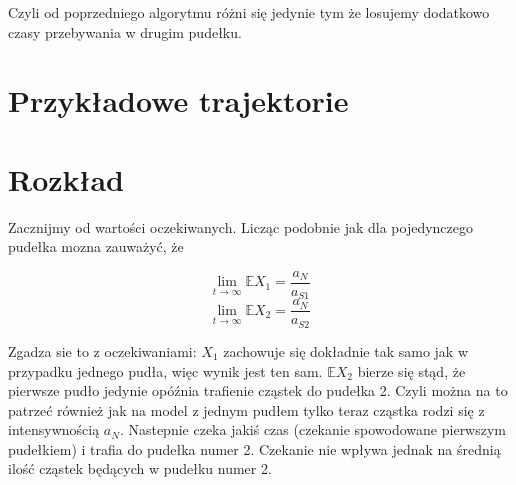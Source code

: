 \documentclass{article}
\begin{document}
Czyli od poprzedniego algorytmu różni się jedynie tym że losujemy dodatkowo czasy przebywania w drugim pudełku.

\section{Przykładowe trajektorie}

\section{Rozkład}

Zacznijmy od wartości oczekiwanych. Licząc podobnie jak dla pojedynczego pudełka mozna zauważyć, że 

\[\lim_{t\rightarrow \infty}\mathbb{E}X_1 = \frac{a_N}{a_{S1}} \]
\[\lim_{t\rightarrow \infty}\mathbb{E}X_2 = \frac{a_N}{a_{S2}} \]

Zgadza sie to z oczekiwaniami:
$X_1$ zachowuje się dokładnie tak samo jak w przypadku jednego pudła, więc wynik jest ten sam. $\mathbb{E}X_2$ bierze się stąd, że pierwsze pudło jedynie opóźnia trafienie cząstek do pudełka 2. Czyli można na to patrzeć również jak na model z jednym pudłem tylko teraz cząstka rodzi się z intensywnością $a_N$. Nastepnie czeka jakiś czas (czekanie spowodowane pierwszym pudełkiem) i trafia do pudełka numer 2. Czekanie nie wpływa jednak na średnią ilość cząstek będących w pudełku numer 2.
\end{document}
